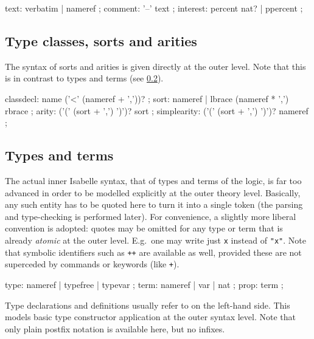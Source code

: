 \begin{rail}
  text: verbatim | nameref
  ;
  comment: '--' text
  ;
  interest: percent nat? | ppercent
  ;
\end{rail}


\subsection{Type classes, sorts and arities}

The syntax of sorts and arities is given directly at the outer level.  Note
that this is in contrast to types and terms (see \ref{sec:types-terms}).

\begin{rail}
  classdecl: name ('<' (nameref + ','))?
  ;
  sort: nameref | lbrace (nameref * ',') rbrace
  ;
  arity: ('(' (sort + ',') ')')? sort
  ;
  simplearity: ('(' (sort + ',') ')')? nameref
  ;
\end{rail}


\subsection{Types and terms}\label{sec:types-terms}

The actual inner Isabelle syntax, that of types and terms of the logic, is far
too advanced in order to be modelled explicitly at the outer theory level.
Basically, any such entity has to be quoted here to turn it into a single
token (the parsing and type-checking is performed later).  For convenience, a
slightly more liberal convention is adopted: quotes may be omitted for any
type or term that is already \emph{atomic} at the outer level.  E.g.\ one may
write just \texttt{x} instead of \texttt{"x"}.  Note that symbolic identifiers
such as \texttt{++} are available as well, provided these are not superceded
by commands or keywords (like \texttt{+}).

\begin{rail}
  type: nameref | typefree | typevar
  ;
  term: nameref | var | nat
  ;
  prop: term
  ;
\end{rail}

Type declarations and definitions usually refer to  on
the left-hand side.  This models basic type constructor application at the
outer syntax level.  Note that only plain postfix notation is available here,
but no infixes.

